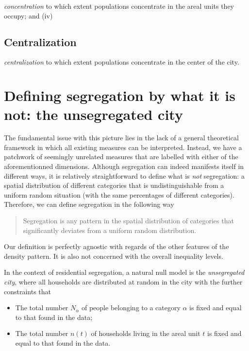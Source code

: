 {\it concentration} to which extent populations
concentrate in the areal units they occupy; and (iv) 

\subsection{Centralization}
\label{sub:centralization}

{\it centralization} to
which extent populations concentrate in the center of the city.\\


\section{Defining segregation by what it is not: the unsegregated city}
\label{sec:null_model_the_unsegregated_city}

The fundamental issue with this picture lies in the lack of a general theoretical framework
in which all existing measures can be interpreted.  Instead, we have a
patchwork of seemingly unrelated measures that are labelled with
either of the aforementionned dimensions. Although segregation can
indeed manifests itself in different ways, it is relatively
straightforward to define what is \emph{not} segregation: a spatial
distribution of different categories that is undistinguishable from a
uniform random situation (with the same percentages of different
categories). Therefore, we can define segregation in the following way 

\begin{quote}
Segregation is any pattern in the spatial distribution of categories that significantly 
deviates from a uniform random distribution. 
\end{quote} 

Our definition is perfectly agnostic with regards of the other features of the
density pattern. It is also not concerned with the overall inequality levels. 


In the context of residential segregation, a natural null model is the
\emph{unsegregated city}, where all households are distributed at
random in the city with the further constraints that

\begin{itemize}
    \item The total number $N_\alpha$ of people belonging to a category
	    $\alpha$ is fixed and equal to that found in the data;
    \item The total number $n(t)$ of households living in the areal unit $t$ is
	    fixed and equal to that found in the data.
\end{itemize}

